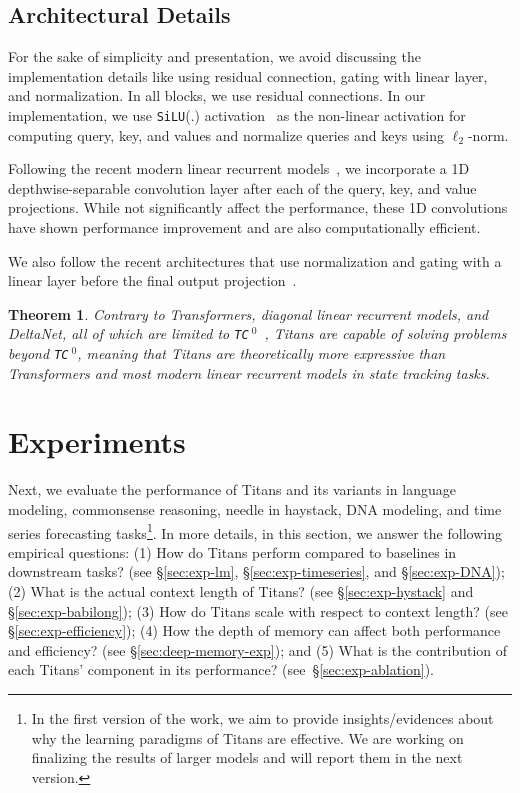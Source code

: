 \documentclass{article}
\newcommand{\citep}{\parencite}
\newtheorem{theorem}{Theorem}[section]
\newcommand{\head}[1]{\vspace{1.7mm}\noindent{{\textcolor{c3}{\bf #1.}}}}
\begin{document}
\subsection{Architectural Details}
For the sake of simplicity and presentation, we avoid discussing the implementation details like using residual connection, gating with linear layer, and normalization. In all blocks, we use residual connections. In our implementation, we use \texttt{SiLU}(.) activation~\citep{elfwing2018sigmoid} as the non-linear activation for computing query, key, and values and normalize queries and keys using $\ell_2$-norm. 

\head{Convolution}
Following the recent modern linear recurrent models~\citep{yang2024gated, gu2024mamba}, we  incorporate a 1D depthwise-separable convolution layer after each of the query, key, and value projections. While not significantly affect the performance, these 1D convolutions have shown performance improvement and are also computationally efficient. 

\head{Gating} We also follow the recent architectures that use normalization and gating with a linear layer before the final output projection~\citep{mehta2023long}. 

\begin{theorem}
    Contrary to Transformers, diagonal linear recurrent models, and DeltaNet, all of which are limited to \texttt{TC}$\:^0$~\citep{merrill2024the}, Titans are capable of solving problems beyond \texttt{TC}$\:^0$, meaning that Titans are theoretically more expressive than Transformers and most modern linear recurrent models in state tracking tasks. 
\end{theorem}

\section{Experiments}\label{sec:experiments}
\lettrine[lines=3]{N}{}ext, we evaluate the performance of Titans and its variants in language modeling, commonsense reasoning, needle in haystack, DNA modeling, and time series forecasting tasks\footnote{In the first version of the work, we aim to provide insights/evidences about why the learning paradigms of Titans are effective. We are working on finalizing the results of larger models and will report them in the next version.}. In more details, in this section, we answer the following empirical questions: (1) How do Titans perform compared to baselines in downstream tasks? (\textcolor{c1}{see \S}\ref{sec:exp-lm}, \textcolor{c1}{\S}\ref{sec:exp-timeseries}, \textcolor{c1}{and \S}\ref{sec:exp-DNA}); (2) What is the actual context length of Titans? (\textcolor{c1}{see \S}\ref{sec:exp-hystack} \textcolor{c1}{and \S}\ref{sec:exp-babilong}); (3) How do Titans scale with respect to context length? (\textcolor{c1}{see \S}\ref{sec:exp-efficiency}); (4) How the depth of memory can affect both performance and efficiency? (\textcolor{c1}{see \S}\ref{sec:deep-memory-exp}); and (5) What is the contribution of each Titans' component in its performance? (\textcolor{c1}{see~\S}\ref{sec:exp-ablation}).
\end{document}
